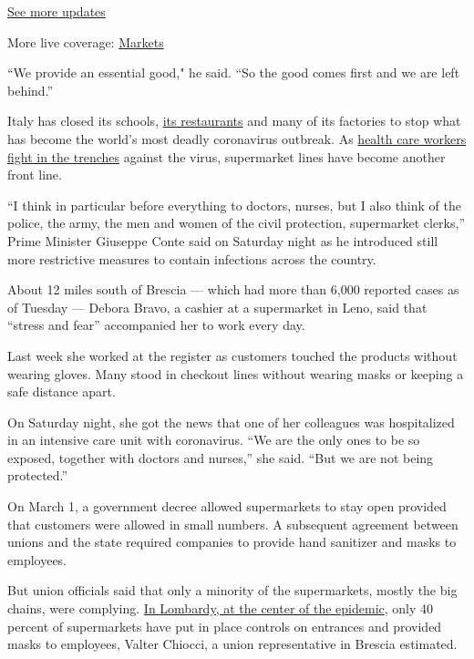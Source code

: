 \href{https://www.nytimes3xbfgragh.onion/2020/09/04/world/covid-19-coronavirus.html?action=click\&pgtype=Article\&state=default\&region=MAIN_CONTENT_1\&context=storylines_live_updates}{See
more updates}

More live coverage:
\href{https://www.nytimes3xbfgragh.onion/live/2020/09/04/business/stock-market-today-coronavirus?action=click\&pgtype=Article\&state=default\&region=MAIN_CONTENT_1\&context=storylines_live_updates}{Markets}

``We provide an essential good," he said. ``So the good comes first and
we are left behind.''

Italy has closed its schools,
\href{https://www.nytimes3xbfgragh.onion/2020/03/09/world/europe/italy-lockdown-coronavirus.html}{its
restaurants} and many of its factories to stop what has become the
world's most deadly coronavirus outbreak. As
\href{https://www.nytimes3xbfgragh.onion/2020/03/12/world/europe/12italy-coronavirus-health-care.html}{health
care workers fight in the trenches} against the virus, supermarket lines
have become another front line.

``I think in particular before everything to doctors, nurses, but I also
think of the police, the army, the men and women of the civil
protection, supermarket clerks,'' Prime Minister Giuseppe Conte said on
Saturday night as he introduced still more restrictive measures to
contain infections across the country.

About 12 miles south of Brescia --- which had more than 6,000 reported
cases as of Tuesday --- Debora Bravo, a cashier at a supermarket in
Leno, said that ``stress and fear'' accompanied her to work every day.

Last week she worked at the register as customers touched the products
without wearing gloves. Many stood in checkout lines without wearing
masks or keeping a safe distance apart.

On Saturday night, she got the news that one of her colleagues was
hospitalized in an intensive care unit with coronavirus. ``We are the
only ones to be so exposed, together with doctors and nurses,'' she
said. ``But we are not being protected.''

On March 1, a government decree allowed supermarkets to stay open
provided that customers were allowed in small numbers. A subsequent
agreement between unions and the state required companies to provide
hand sanitizer and masks to employees.

But union officials said that only a minority of the supermarkets,
mostly the big chains, were complying.
\href{https://www.nytimes3xbfgragh.onion/2020/03/23/world/europe/italy-coronavirus-hospitals.html}{In
Lombardy, at the center of the epidemic}, only 40 percent of
supermarkets have put in place controls on entrances and provided masks
to employees, Valter Chiocci, a union representative in Brescia
estimated.

